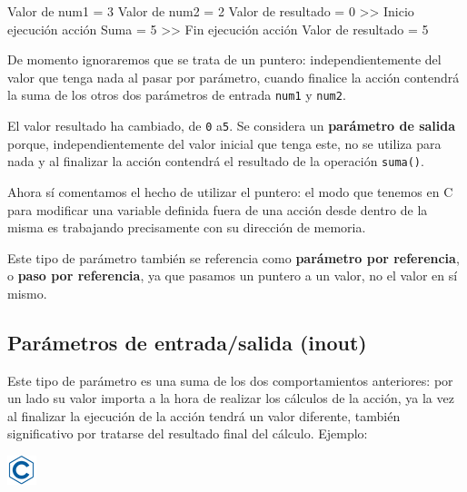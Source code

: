 \documentclass[
]{book}
\newenvironment{Shaded}{\begin{snugshade}}{\end{snugshade}}
\newcommand{\DecValTok}[1]{\textcolor[rgb]{0.00,0.00,0.81}{#1}}
\newcommand{\NormalTok}[1]{#1}
\begin{document}
\begin{Shaded}
\begin{Highlighting}[]
\NormalTok{Valor de num1 = }\DecValTok{3}
\NormalTok{Valor de num2 = }\DecValTok{2}
\NormalTok{Valor de resultado = }\DecValTok{0}
\NormalTok{\textgreater{}\textgreater{} Inicio ejecución acción}
\NormalTok{Suma = }\DecValTok{5}
\NormalTok{\textgreater{}\textgreater{} Fin ejecución acción}
\NormalTok{Valor de resultado = }\DecValTok{5}
\end{Highlighting}
\end{Shaded}

De momento ignoraremos que se trata de un puntero: independientemente del valor que tenga nada al pasar por parámetro, cuando finalice la acción contendrá la suma de los otros dos parámetros de entrada \texttt{num1} y \texttt{num2}.

El valor resultado ha cambiado, de \texttt{0} a\texttt{5}. Se considera un \textbf{parámetro de salida} porque, independientemente del valor inicial que tenga este, no se utiliza para nada y al finalizar la acción contendrá el resultado de la operación \texttt{suma()}.

Ahora sí comentamos el hecho de utilizar el puntero: el modo que tenemos en C para modificar una variable definida fuera de una acción desde dentro de la misma es trabajando precisamente con su dirección de memoria.

Este tipo de parámetro también se referencia como \textbf{parámetro por referencia}, o \textbf{paso por referencia}, ya que pasamos un puntero a un valor, no el valor en sí mismo.

\hypertarget{paruxe1metros-de-entradasalida-inout}{%
\subsection{Parámetros de entrada/salida (inout)}\label{paruxe1metros-de-entradasalida-inout}}

Este tipo de parámetro es una suma de los dos comportamientos anteriores: por un lado su valor importa a la hora de realizar los cálculos de la acción, ya la vez al finalizar la ejecución de la acción tendrá un valor diferente, también significativo por tratarse del resultado final del cálculo. Ejemplo:

\includegraphics{./img/c.png}
\end{document}
